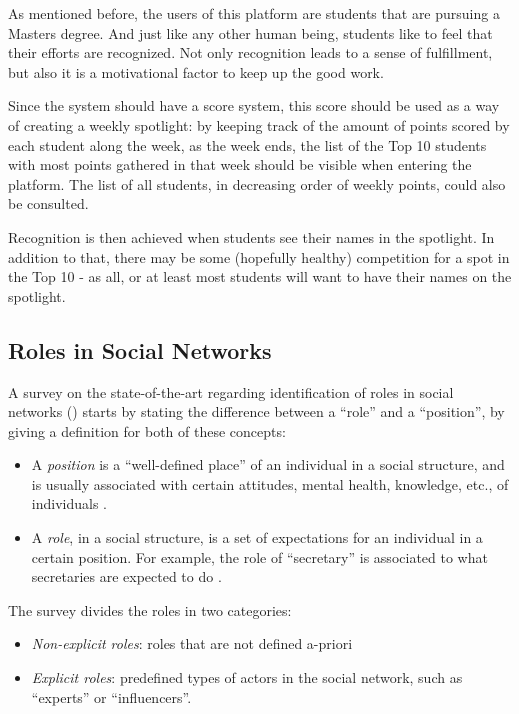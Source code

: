 As mentioned before, the users of this platform are students that are pursuing a Masters degree. And just like any other human being, students like to feel that their efforts are recognized. Not only recognition leads to a sense of fulfillment, but also it is a motivational factor to keep up the good work. 

Since the system should have a score system, this score should be used as a way of creating a weekly spotlight: by keeping track of the amount of points scored by each student along the week, as the week ends, the list of the Top 10 students with most points gathered in that week should be visible when entering the platform. The list of all students, in decreasing order of weekly points, could also be consulted.

Recognition is then achieved when students see their names in the spotlight. In addition to that, there may be some (hopefully healthy) competition for a spot in the Top 10 - as all, or at least most students will want to have their names on the spotlight.

\subsection{Roles in Social Networks}
A survey on the state-of-the-art regarding identification of roles in social networks (\cite{forestier2012roles}) starts by stating the difference between a ``role'' and a ``position'', by giving a definition for both of these concepts:
\begin{itemize}
\item A \textit{position} is a ``well-defined place'' of an individual in a social structure, and is usually associated with certain attitudes, mental health, knowledge, etc., of individuals \cite{forestier2012roles,borgatti1992notions}.
\item A \textit{role}, in a social structure, is a set of expectations for an individual in a certain position. For example, the role of ``secretary'' is associated to what secretaries are expected to do \cite{forestier2012roles,nadel1957theory}.
\end{itemize}
The survey divides the roles in two categories:
\begin{itemize}
\item \textit{Non-explicit roles}: roles that are not defined a-priori
\item \textit{Explicit roles}: predefined types of actors in the social network, such as ``experts'' or ``influencers''.
\end{itemize}

